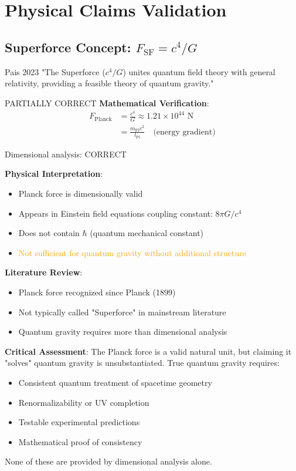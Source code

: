 \section{Physical Claims Validation}

\subsection{Superforce Concept: $F_{\text{SF}} = c^4/G$}

\begin{frameworkclaim}{Pais 2023}
"The Superforce ($c^4/G$) unites quantum field theory with general relativity, providing a feasible theory of quantum gravity."
\end{frameworkclaim}

\begin{factcheck}{PARTIALLY CORRECT}
\textbf{Mathematical Verification}:
\begin{align}
F_{\text{Planck}} &= \frac{c^4}{G} \approx 1.21 \times 10^{44} \text{ N} \\
&= \frac{m_{\text{Pl}} c^2}{l_{\text{Pl}}} \quad \text{(energy gradient)}
\end{align}

Dimensional analysis: \textcolor{validcolor}{CORRECT}

\textbf{Physical Interpretation}:
\begin{itemize}
    \item[$+$] Planck force is dimensionally valid
    \item[$+$] Appears in Einstein field equations coupling constant: $8\pi G/c^4$
    \item[$\sim$] Does not contain $\hbar$ (quantum mechanical constant)
    \item[$-$] \textcolor{orange}{Not sufficient for quantum gravity without additional structure}
\end{itemize}

\textbf{Literature Review}:
\begin{itemize}
    \item Planck force recognized since Planck (1899) \cite{planck1899natural}
    \item Not typically called "Superforce" in mainstream literature
    \item Quantum gravity requires more than dimensional analysis \cite{rovelli2004quantum}
\end{itemize}

\textbf{Critical Assessment}:
The Planck force is a valid natural unit, but claiming it "solves" quantum gravity is \textcolor{claimcolor}{unsubstantiated}. True quantum gravity requires:
\begin{itemize}
    \item Consistent quantum treatment of spacetime geometry
    \item Renormalizability or UV completion
    \item Testable experimental predictions
    \item Mathematical proof of consistency
\end{itemize}

None of these are provided by dimensional analysis alone.
\end{factcheck}


